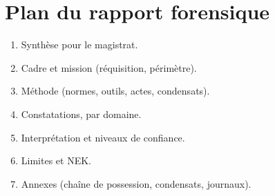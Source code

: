 \section*{Plan du rapport forensique}
\begin{enumerate}
    \item Synthèse pour le magistrat.
    \item Cadre et mission (réquisition, périmètre).
    \item Méthode (normes, outils, actes, condensats).
    \item Constatations, par domaine.
    \item Interprétation et niveaux de confiance.
    \item Limites et NEK.
    \item Annexes (chaîne de possession, condensats, journaux).
\end{enumerate}
